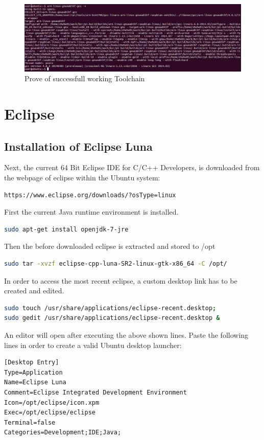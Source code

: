 \begin{figure}[H]
	\centering\includegraphics[width=1\textwidth]{fig/Dev_Concept/Cross_compile_success.jpg}
	\caption{Prove of successfull working Toolchain}
	\label{fig:Cross_compile_success}
\end{figure}

\section{Eclipse}
\label{subsec:subsec-Eclipse-header}

\subsection{Installation of Eclipse Luna}
\label{subsec:subsec-Eclipse}

Next, the current 64 Bit Eclipse IDE for C/C++ Developers, is downloaded from the webpage of eclipse within the Ubuntu system:
\begin{lstlisting}
https://www.eclipse.org/downloads/?osType=linux
\end{lstlisting}

First the current Java runtime environment is installed.
\begin{lstlisting}[language=bash,otherkeywords={sudo,tar,touch,gedit,cp,apt-get,mkdir}]
sudo apt-get install openjdk-7-jre
\end{lstlisting}
Then the before downloaded eclipse is extracted and stored to /opt
\begin{lstlisting}[language=bash,otherkeywords={sudo,tar,touch,gedit,apt-get,mkdir}]
sudo tar -xvzf eclipse-cpp-luna-SR2-linux-gtk-x86_64 -C /opt/
\end{lstlisting}
In order to access the most recent eclipse, a custom desktop link has to be created and edited. 
\begin{lstlisting}[language=bash,otherkeywords={sudo,tar,touch,gedit,cp,apt-get,mkdir}]
sudo touch /usr/share/applications/eclipse-recent.desktop;
sudo gedit /usr/share/applications/eclipse-recent.desktop &
\end{lstlisting}
An editor will open after executing the above shown lines. Paste the following lines in order to create a valid Ubuntu desktop launcher:
\begin{lstlisting}
[Desktop Entry]
Type=Application
Name=Eclipse Luna
Comment=Eclipse Integrated Development Environment
Icon=/opt/eclipse/icon.xpm
Exec=/opt/eclipse/eclipse
Terminal=false
Categories=Development;IDE;Java;
\end{lstlisting}

